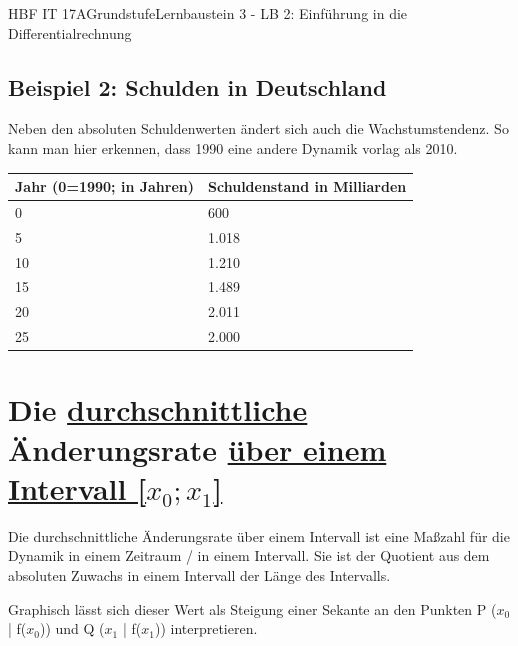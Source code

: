 \documentclass[11pt,twocolumn,oneside,openany,headings=optiontotoc,11pt,numbers=noenddot,final]{article}
\begin{document}
\begin{worksheet}{HBF IT 17A}{Grundstufe}{Lernbaustein 3 - LB 2: Einführung in die Differentialrechnung}
		\subsection*{Beispiel 2: Schulden in Deutschland}
		Neben den absoluten Schuldenwerten ändert sich auch die Wachstumstendenz. So kann man hier erkennen, dass 1990 eine andere Dynamik vorlag als 2010.
		\begin{table}[htb]
			\begin{tabularx}{0.5\textwidth}{|X|X|}
				\hline
				Jahr (0=1990; in Jahren) & Schuldenstand in Milliarden\\
				\hline
				0 & 600\\
				\hline
				5 & 1.018\\
				\hline
				10 & 1.210\\
				\hline
				15 & 1.489\\
				\hline
				20 & 2.011\\
				\hline
				25 & 2.000\\
				\hline
			\end{tabularx}
		\end{table}
		\section{Die \underline{durchschnittliche} Änderungsrate \underline{über einem Intervall [\(x_{0};x_{1}\)]}}
		Die durchschnittliche Änderungsrate über einem Intervall ist eine Maßzahl für die Dynamik in einem Zeitraum / in einem Intervall. Sie ist der Quotient aus dem absoluten Zuwachs in einem Intervall der Länge des Intervalls.\\
		\par\noindent
		Graphisch lässt sich dieser Wert als Steigung einer Sekante an den Punkten P (\(x_{0}\) | f(\(x_{0}\))) und Q (\(x_{1}\) | f(\(x_{1}\))) interpretieren.

\end{worksheet}
\end{document}
